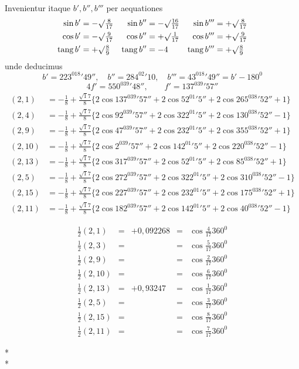 Invenientur itaque $b',b'',b'''$ per aequationes
\[
\begin{aligned}
\sin b'&=-\surd\tfrac8{17}&\sin b''&=-\surd\tfrac{16}{17}&\sin b'''&=+\surd\tfrac8{17}\\
\cos b'&=-\surd\tfrac9{17}&\cos b''&=+\surd\tfrac1{17}&\cos b'''&=+\surd\tfrac9{17}\\
\operatorname{tang}b'&=+\surd\tfrac89&\operatorname{tang}b''&=-4&\operatorname{tang}b'''&=+\surd\tfrac89
\end{aligned}
\]
unde deducimus
\[
b'=223^018'49'',\quad b''=284^02'10,\quad b'''=43^018'49''=b'-180^0
\]
\[
4f'=550^039'48'',\qquad f'=137^039'57''
\]
\[
\begin{aligned}
(2,1)&=-\frac18+\frac{\surd17}8\{2\cos137^039'57''+2\cos52^01'5''+2\cos265^038'52''+1\}\\
(2,4)&=-\frac18+\frac{\surd17}8\{2\cos92^039'57''+2\cos322^01'5''+2\cos130^038'52''-1\}\\
(2,9)&=-\frac18+\frac{\surd17}8\{2\cos47^039'57''+2\cos232^01'5''+2\cos355^038'52''+1\}\\
(2,10)&=-\frac18+\frac{\surd17}8\{2\cos2^039'57''+2\cos142^01'5''+2\cos220^038'52''-1\}\\
(2,13)&=-\frac18+\frac{\surd17}8\{2\cos317^039'57''+2\cos52^01'5''+2\cos85^038'52''+1\}\\
(2,5)&=-\frac18+\frac{\surd17}8\{2\cos272^039'57''+2\cos322^01'5''+2\cos310^038'52''-1\}\\
(2,15)&=-\frac18+\frac{\surd17}8\{2\cos227^039'57''+2\cos232^01'5''+2\cos175^038'52''+1\}\\
(2,11)&=-\frac18+\frac{\surd17}8\{2\cos182^039'57''+2\cos142^01'5''+2\cos40^038'52''-1\}
\end{aligned}
\]

\[
\begin{array}{rclcl}
\frac12(2,1)&=&+0{,}092268&=&\cos\frac4{17}360^0\\[3pt]
\frac12(2,3)&=&&=&\cos\frac5{17}360^0\\[3pt]
\frac12(2,9)&=&&=&\cos\frac2{17}360^0\\[3pt]
\frac12(2,10)&=&&=&\cos\frac6{17}360^0\\[3pt]
\frac12(2,13)&=&+0{,}93247&=&\cos\frac1{17}360^0\\[3pt]
\frac12(2,5)&=&&=&\cos\frac3{17}360^0\\[3pt]
\frac12(2,15)&=&&=&\cos\frac8{17}360^0\\[3pt]
\frac12(2,11)&=&&=&\cos\frac7{17}360^0
\end{array}
\]
\begin{center}*\qquad\qquad*\\*\end{center}

